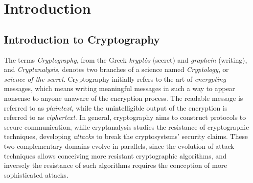 
\chapter{Introduction} %

\label{ChapterIntroduction}


\section{Introduction to Cryptography}
The terms \emph{Cryptography}, from the Greek \emph{krypt\`os} (secret) and \emph{graphein} (writing), and \emph{Cryptanalysis}, denotes two branches of a science named \emph{Cryptology}, or \emph{science of the secret}. Cryptography initially refers to the art of \emph{encrypting} messages, which means writing meaningful messages in such a way to appear nonsense to anyone unaware of the encryption process. The readable message is referred to as \emph{plaintext}, while the unintelligible output of the encryption is referred to as \emph{ciphertext}. In general, cryptography aims to construct protocols to secure communication, while cryptanalysis studies the resistance of cryptographic techniques, developing \emph{attacks} to break the cryptosystems' security claims. These two complementary domains evolve in parallels, since the evolution of attack techniques allows conceiving more resistant cryptographic algorithms, and inversely the resistance of such algorithms requires the conception of more sophisticated attacks.\\

